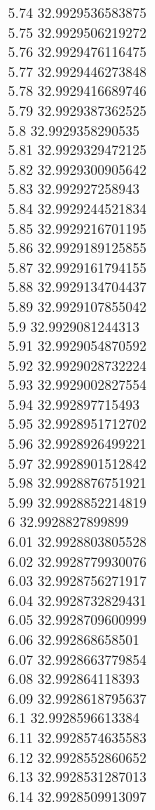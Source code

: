 {5.74	32.9929536583875\\
5.75	32.9929506219272\\
5.76	32.9929476116475\\
5.77	32.9929446273848\\
5.78	32.9929416689746\\
5.79	32.9929387362525\\
5.8	32.9929358290535\\
5.81	32.9929329472125\\
5.82	32.9929300905642\\
5.83	32.992927258943\\
5.84	32.9929244521834\\
5.85	32.9929216701195\\
5.86	32.9929189125855\\
5.87	32.9929161794155\\
5.88	32.9929134704437\\
5.89	32.9929107855042\\
5.9	32.9929081244313\\
5.91	32.9929054870592\\
5.92	32.9929028732224\\
5.93	32.9929002827554\\
5.94	32.992897715493\\
5.95	32.9928951712702\\
5.96	32.9928926499221\\
5.97	32.9928901512842\\
5.98	32.9928876751921\\
5.99	32.9928852214819\\
6	32.9928827899899\\
6.01	32.9928803805528\\
6.02	32.9928779930076\\
6.03	32.9928756271917\\
6.04	32.9928732829431\\
6.05	32.9928709600999\\
6.06	32.992868658501\\
6.07	32.9928663779854\\
6.08	32.992864118393\\
6.09	32.9928618795637\\
6.1	32.9928596613384\\
6.11	32.9928574635583\\
6.12	32.9928552860652\\
6.13	32.9928531287013\\
6.14	32.9928509913097\\
}
